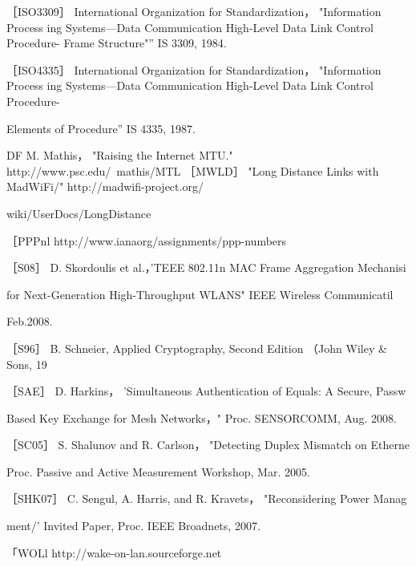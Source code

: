 ［ISO3309］ International Organization for Standardization， "Information Process
ing Systems—Data Communication High-Level Data Link Control Procedure-
Frame Structure"” IS 3309, 1984.

［ISO4335］ International Organization for Standardization， "Information Process
ing Systems—Data Communication High-Level Data Link Control Procedure-

Elements of Procedure” IS 4335, 1987.

DF M. Mathis， "Raising the Internet MTU." http://www.psc.edu/~mathis/MTL
［MWLD］ "Long Distance Links with MadWiFi/" http://madwifi-project.org/

wiki/UserDocs/LongDistance

［PPPnl http://www.ianaorg/assignments/ppp-numbers

［S08］ D. Skordoulis et al.，'TEEE 802.11n MAC Frame Aggregation Mechanisi

for Next-Generation High-Throughput WLANS" IEEE Wireless Communicatil

Feb.2008.

［S96］ B. Schneier, Applied Cryptography, Second Edition （John Wiley \& Sons, 19

［SAE］ D. Harkins， 'Simultaneous Authentication of Equals: A Secure, Passw

Based Key Exchange for Mesh Networks，" Proc. SENSORCOMM, Aug. 2008.

［SC05］ S. Shalunov and R. Carlson， "Detecting Duplex Mismatch on Etherne

Proc. Passive and Active Measurement Workshop, Mar. 2005.

［SHK07］ C. Sengul, A. Harris, and R. Kravets， "Reconsidering Power Manag

ment/' Invited Paper, Proc. IEEE Broadnets, 2007.

「WOLl http://wake-on-lan.sourceforge.net